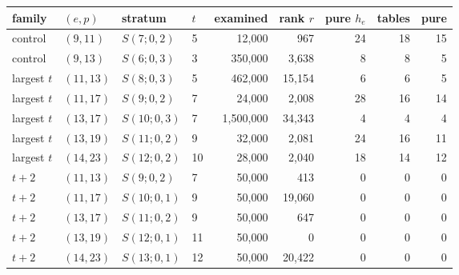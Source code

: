 \begin{tabular}{@{}llllrrrrr@{}}
\toprule
family & $(e,p)$ & stratum & $t$ & examined & rank $r$ & pure $h_e$ & tables & pure\\
\midrule
control & $(9,11)$ & $S(7;0,2)$ & 5 & 12{,}000 & 967 & 24 & 18 & 15\\
control & $(9,13)$ & $S(6;0,3)$ & 3 & 350{,}000 & 3{,}638 & 8 & 8 & 5\\
largest $t$ & $(11,13)$ & $S(8;0,3)$ & 5 & 462{,}000 & 15{,}154 & 6 & 6 & 5\\
largest $t$ & $(11,17)$ & $S(9;0,2)$ & 7 & 24{,}000 & 2{,}008 & 28 & 16 & 14\\
largest $t$ & $(13,17)$ & $S(10;0,3)$ & 7 & 1{,}500{,}000 & 34{,}343 & 4 & 4 & 4\\
largest $t$ & $(13,19)$ & $S(11;0,2)$ & 9 & 32{,}000 & 2{,}081 & 24 & 16 & 11\\
largest $t$ & $(14,23)$ & $S(12;0,2)$ & 10 & 28{,}000 & 2{,}040 & 18 & 14 & 12\\
$t+2$ & $(11,13)$ & $S(9;0,2)$ & 7 & 50{,}000 & 413 & 0 & 0 & 0\\
$t+2$ & $(11,17)$ & $S(10;0,1)$ & 9 & 50{,}000 & 19{,}060 & 0 & 0 & 0\\
$t+2$ & $(13,17)$ & $S(11;0,2)$ & 9 & 50{,}000 & 647 & 0 & 0 & 0\\
$t+2$ & $(13,19)$ & $S(12;0,1)$ & 11 & 50{,}000 & 0 & 0 & 0 & 0\\
$t+2$ & $(14,23)$ & $S(13;0,1)$ & 12 & 50{,}000 & 20{,}422 & 0 & 0 & 0\\
\bottomrule
\end{tabular}
